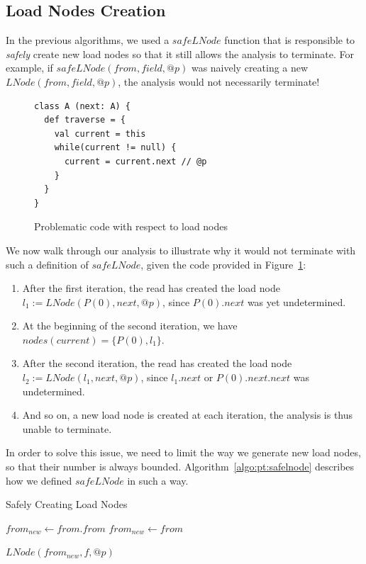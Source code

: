 \subsection{Load Nodes Creation}
In the previous algorithms, we used a $safeLNode$ function that is responsible
to \emph{safely} create new load nodes so that it still allows the analysis
to terminate. For example, if $safeLNode(from, field, @p)$ was naively creating
a new $LNode(from, field, @p)$, the analysis would not necessarily terminate!

\begin{figure}[h]
\begin{lstlisting}
class A (next: A) {
  def traverse = {
    val current = this
    while(current != null) {
      current = current.next // @p
    }
  }
}
\end{lstlisting}
    \caption{Problematic code with respect to load nodes}
    \label{fig:pt:lnodeloop}
\end{figure}

We now walk through our analysis to illustrate why it would not terminate with
such a definition of $safeLNode$, given the code provided in
Figure~\ref{fig:pt:lnodeloop}:
\begin{enumerate}
    \item After the first iteration, the read has created the load node \\
    $l_1 := LNode(P(0), next, @p)$, since $P(0).next$ was yet undetermined.
    \item At the beginning of the second iteration, we have $nodes(current) =
    \{ P(0), l_1 \}$.
    \item After the second iteration, the read has created the load node
    $l_2 := LNode(l_1, next, @p)$, since $l_1.next$ or  $P(0).next.next$ was
    undetermined.
    \item And so on, a new load node is created at each iteration, the analysis
    is thus unable to terminate.
\end{enumerate}

In order to solve this issue, we need to limit the way we generate new load
nodes, so that their number is always bounded.
Algorithm~\ref{algo:pt:safelnode} describes how we defined $safeLNode$ in such
a way.

\begin{algorithm}
\caption{Safely Creating Load Nodes}\label{algo:pt:safelnode}
\begin{algorithmic}[1]
        \State $from_{new} \gets from.from$
    \Else
        \State $from_{new} \gets from$
    \EndIf

    \State \Return $LNode(from_{new}, f, @p)$
\EndFunction
\end{algorithmic}
\end{algorithm}

